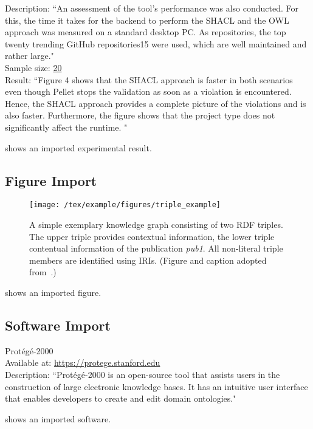 \begin{expresult}
Description: ``An assessment of the tool’s performance was also conducted. For this, the time it takes for the backend to perform the SHACL and the OWL approach was measured on a standard desktop PC. As repositories, the top twenty trending GitHub repositories15 were used, which are well maintained and rather large."~\cite{martin2022specification}\\
Sample size: \url{20}\\
Result: ``Figure 4 shows that the SHACL approach is faster in both scenarios even though Pellet stops the validation as soon as a violation is encountered. Hence, the SHACL approach provides a complete picture of the violations and is also faster. Furthermore, the figure shows that the project type does not significantly affect the runtime. "\\
\label{expresult:quare-performance}
\end{expresult}
 shows an imported experimental result.

\subsection{Figure Import}

\begin{figure}[htb!]
\centering
\texttt{[image: /tex/example/figures/triple\_example]}
\caption{A simple exemplary knowledge graph consisting of two RDF triples. The upper triple provides contextual information, the lower triple contentual information of the publication \emph{{pub1}}. All non-literal triple members are identified using IRIs. (Figure and caption adopted from~\cite{Martin21}.)}
\label{fig:contentual-contextual}
\end{figure}
 shows an imported figure.

\subsection{Software Import}

\begin{software}
Prot{\'{e}}g{\'{e}}-2000~\cite{DBLP:conf/amia/NoyCFKTVM03}\\
Available at: \url{https://protege.stanford.edu}\\
Description: ``Prot\'{e}g\'{e}-2000 is an open-source tool that assists users in the construction of large electronic knowledge bases. It has an intuitive user interface that enables developers to create and edit domain ontologies."~\cite{DBLP:conf/amia/NoyCFKTVM03}
\label{software:protege}
\end{software}
 shows an imported software.


